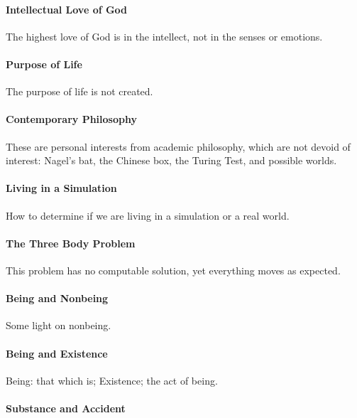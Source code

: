 \paragraph{Intellectual Love of God}


The highest love of God is in the intellect, not in the senses or emotions.

\paragraph{Purpose of Life}


The purpose of life is not created.

\paragraph{Contemporary Philosophy}


These are personal interests from academic philosophy, which are not devoid of interest: Nagel's bat, the Chinese box, the Turing Test, and possible worlds.

\paragraph{Living in a Simulation}


How to determine if we are living in a simulation or a real world.

\paragraph{The Three Body Problem}


This problem has no computable solution, yet everything moves as expected.

\paragraph{Being and Nonbeing}


Some light on nonbeing.

\paragraph{Being and Existence}


Being: that which is; Existence; the act of being.

\paragraph{Substance and Accident}


